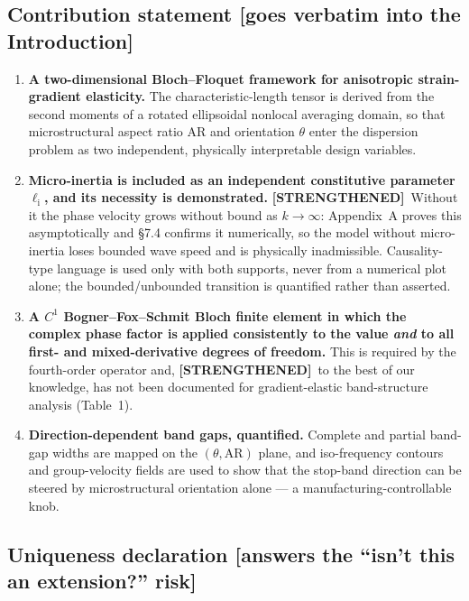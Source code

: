 \documentclass[11pt,a4paper]{article}
\newcommand{\bp}[1]{\textcolor{accent}{\textsf{\footnotesize [#1]}}}
\newcommand{\STR}{{\color{strcol}\textbf{[STRENGTHENED]}}}
\begin{document}
\subsection{Contribution statement \bp{goes verbatim into the Introduction}}

\begin{enumerate}[label=\textbf{C\arabic*.}]
\item \textbf{A two-dimensional Bloch--Floquet framework for anisotropic strain-gradient
elasticity.} The characteristic-length tensor is derived from the second moments of a
rotated ellipsoidal nonlocal averaging domain, so that microstructural aspect ratio
$\mathrm{AR}$ and orientation $\theta$ enter the dispersion problem as two independent,
physically interpretable design variables.

\item \textbf{Micro-inertia is included as an independent constitutive parameter
$\ell_{\mathrm{i}}$, and its necessity is demonstrated.} \STR\ Without it the phase velocity
grows without bound as $k\to\infty$: Appendix~A proves this asymptotically and \S7.4 confirms it numerically, so the model without micro-inertia loses bounded wave speed and is physically inadmissible. Causality-type language is used only with both supports, never from a numerical plot alone; the bounded/unbounded transition is quantified rather than asserted.

\item \textbf{A $C^1$ Bogner--Fox--Schmit Bloch finite element in which the complex
phase factor is applied consistently to the value \emph{and} to all first- and
mixed-derivative degrees of freedom.} This is required by the fourth-order operator
and, \STR\ to the best of our knowledge, has not been documented for gradient-elastic band-structure analysis (Table~1).

\item \textbf{Direction-dependent band gaps, quantified.} Complete and partial band-gap
widths are mapped on the $(\theta,\mathrm{AR})$ plane, and iso-frequency contours and
group-velocity fields are used to show that the stop-band direction can be steered by
microstructural orientation alone --- a manufacturing-controllable knob.
\end{enumerate}

\subsection{Uniqueness declaration \bp{answers the ``isn't this an extension?'' risk}}
\end{document}
